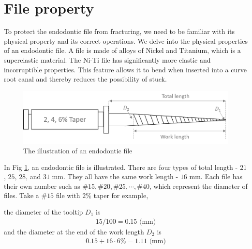 \section{File property}
\hspace*{6mm}To protect the endodontic file from fracturing, we need to be familiar with its physical property and its correct operations. We delve into the physical properties of an endodontic file. A file is made of alloys of Nickel and Titanium, which is a superelastic material. The Ni-Ti file has significantly more elastic and incorruptible properties. This feature allows it to bend when inserted into a curve root canal and thereby reduces the possibility of stuck.
\begin{figure}[htbp]
\begin{center}
\includegraphics[width=1\linewidth]{Images/Endodontic_File.png}
\caption{The illustration of an endodontic file
}\label{fig: Endodontic File}
\end{center}
\end{figure}	
\par
In Fig \ref{fig: Endodontic File}, an endodontic file is illustrated. There are four types of total length - $21$, $25$, $28$, and $31$ mm. They all have the same work length - $16$ mm. Each file has their own number such as $\#15, \#20, \#25, \cdots, \#40$, which represent the diameter of files. Take a $\#15$ file with $2\%$ taper for example,
\par\noindent
the diameter of the tooltip $D_1$ is
\begin{equation*}
\begin{split}
15/100=0.15 \text{ (mm)}
\end{split}
\end{equation*}
and the diameter at the end of the work length $D_2$ is
\begin{equation*}
\begin{split}
0.15 + 16 \cdot 6\% = 1.11 \text{ (mm)}
\end{split}
\end{equation*}
						